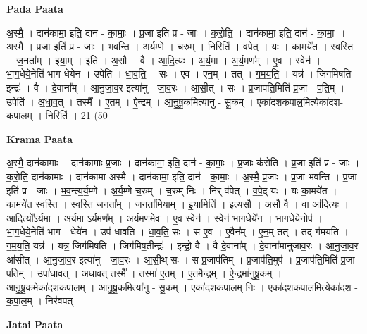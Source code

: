 \documentclass[17pt]{extarticle}
\begin{document}
\textbf{Pada Paata} \newline

अ॒स्मै॒ । दान॑कामा॒ इति॒ दान॑ - का॒माः॒ । प्र॒जा इति॑ प्र - जाः । क॒रो॒ति॒ । दान॑कामा॒ इति॒ दान॑ - का॒माः॒ । अ॒स्मै॒ । प्र॒जा इति॑ प्र - जाः । भ॒व॒न्ति॒ । अ॒र्य॒म्णे । च॒रुम् । निरिति॑ । व॒पे॒त् । यः । का॒मये॑त । स्व॒स्ति । ज॒नता᳚म् । इ॒या॒म् । इति॑ । अ॒सौ । वै । आ॒दि॒त्यः । अ॒र्य॒मा । अ॒र्य॒मण᳚म् । ए॒व । स्वेन॑ । भा॒ग॒धेये॒नेति॑ भाग-धेये॑न । उपेति॑ । धा॒व॒ति॒ । सः । ए॒व । ए॒न॒म् । तत् । ग॒म॒य॒ति॒ । यत्र॑ । जिग॑मिषति । इन्द्रः॑ । वै । दे॒वाना᳚म् । आ॒नु॒जा॒व॒र इत्या॑नु - जा॒व॒रः । आ॒सी॒त् । सः । प्र॒जाप॑ति॒मिति॑ प्र॒जा - प॒ति॒म् । उपेति॑ । अ॒धा॒व॒त् । तस्मै᳚ । ए॒तम् । ऐ॒न्द्रम् । आ॒नु॒षू॒कमित्या॑नु - सू॒कम् । एका॑दशकपाल॒मित्येका॑दश-क॒पा॒ल॒म् । निरिति॑ । 21 (50  \newline


\textbf{Krama Paata} \newline

अ॒स्मै॒ दान॑कामाः । दान॑कामाः प्र॒जाः । दान॑कामा॒ इति॒ दान॑ - का॒माः॒ । प्र॒जाः क॑रोति । प्र॒जा इति॑ प्र - जाः । क॒रो॒ति॒ दान॑कामाः । दान॑कामा अस्मै । दान॑कामा॒ इति॒ दान॑ - का॒माः॒ । अ॒स्मै॒ प्र॒जाः । प्र॒जा भ॑वन्ति । प्र॒जा इति॑ प्र - जाः । भ॒व॒न्त्य॒र्य॒म्णे । अ॒र्य॒म्णे च॒रुम् । च॒रुम् निः । निर् व॑पेत् । व॒पे॒द् यः । यः का॒मये॑त । का॒मये॑त स्व॒स्ति । स्व॒स्ति ज॒नता᳚म् । ज॒नता॑मियाम् । इ॒या॒मिति॑ । इत्य॒सौ । अ॒सौ वै । वा आ॑दि॒त्यः । आ॒दि॒त्यो᳚ऽर्य॒मा । अ॒र्य॒मा ऽर्य॒मण᳚म् । अ॒र्य॒मण॑मे॒व । ए॒व स्वेन॑ । स्वेन॑ भाग॒धेये॑न । भा॒ग॒धेये॒नोप॑ । भा॒ग॒धेये॒नेति॑ भाग - धेये॑न । उप॑ धावति । धा॒व॒ति॒ सः । स ए॒व । ए॒वैन᳚म् । ए॒न॒म् तत् । तद् ग॑मयति । ग॒म॒य॒ति॒ यत्र॑ । यत्र॒ जिग॑मिषति । जिग॑मिष॒तीन्द्रः॑ । इन्द्रो॒ वै । वै दे॒वाना᳚म् । दे॒वाना॑मानुजाव॒रः । आ॒नु॒जा॒व॒र आ॑सीत् । आ॒नु॒जा॒व॒र इत्या॑नु - जा॒व॒रः । आ॒सी॒थ् सः । स प्र॒जाप॑तिम् । प्र॒जाप॑ति॒मुप॑ । प्र॒जाप॑ति॒मिति॑ प्र॒जा - प॒ति॒म् । उपा॑धावत् । अ॒धा॒व॒त् तस्मै᳚ । तस्मा॑ ए॒तम् । ए॒तमै॒न्द्रम् । ऐ॒न्द्रमा॑नुषू॒कम् । आ॒नु॒षू॒कमेका॑दशकपालम् । आ॒नु॒षू॒कमित्या॑नु - सू॒कम् । एका॑दशकपाल॒म् निः । एका॑दशकपाल॒मित्येका॑दश - क॒पा॒ल॒म् । निर॑वपत् \newline

\textbf{Jatai Paata} \newline
\end{document}
